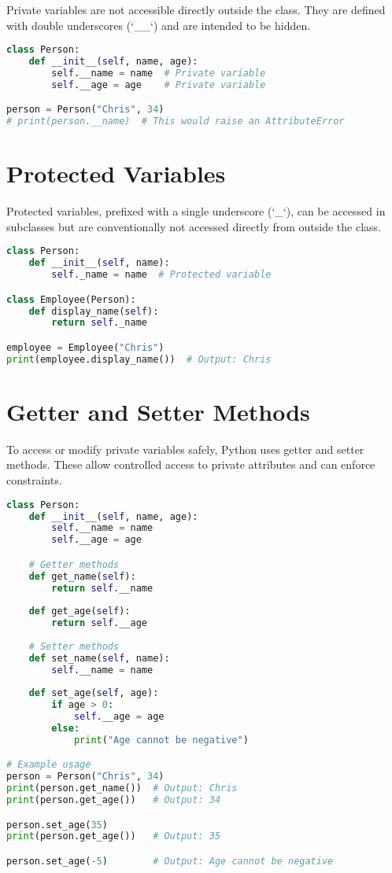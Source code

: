 Private variables are not accessible directly outside the class. They are defined with double underscores (`\_\_`) and are intended to be hidden.

\begin{lstlisting}[language=Python, caption=Private Variables Example]
class Person:
    def __init__(self, name, age):
        self.__name = name  # Private variable
        self.__age = age    # Private variable

person = Person("Chris", 34)
# print(person.__name)  # This would raise an AttributeError
\end{lstlisting}

\section{Protected Variables}

Protected variables, prefixed with a single underscore (`\_`), can be accessed in subclasses but are conventionally not accessed directly from outside the class.

\begin{lstlisting}[language=Python, caption=Protected Variables Example]
class Person:
    def __init__(self, name):
        self._name = name  # Protected variable

class Employee(Person):
    def display_name(self):
        return self._name

employee = Employee("Chris")
print(employee.display_name())  # Output: Chris
\end{lstlisting}

\section{Getter and Setter Methods}

To access or modify private variables safely, Python uses getter and setter methods. These allow controlled access to private attributes and can enforce constraints.

\begin{lstlisting}[language=Python, caption=Encapsulation Using Getter and Setter]
class Person:
    def __init__(self, name, age):
        self.__name = name
        self.__age = age

    # Getter methods
    def get_name(self):
        return self.__name
    
    def get_age(self):
        return self.__age
    
    # Setter methods
    def set_name(self, name):
        self.__name = name
    
    def set_age(self, age):
        if age > 0:
            self.__age = age
        else:
            print("Age cannot be negative")

# Example usage
person = Person("Chris", 34)
print(person.get_name())  # Output: Chris
print(person.get_age())   # Output: 34

person.set_age(35)
print(person.get_age())   # Output: 35

person.set_age(-5)        # Output: Age cannot be negative
\end{lstlisting}

